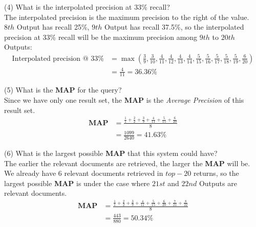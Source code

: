 \documentclass[12pt, letterpaper, twoside]{article}
\begin{document}
\begin{enumerate}
        (4) What is the interpolated precision at 33\% recall?\\
        The interpolated precision is the maximum precision to the right of the value.\\
        $8th$ Output has recall 25\%, $9th$ Output has recall 37.5\%, so the interpolated precision at 33\% recall will be the maximum precision among $9th$ to $20th$ Outputs:
        \begin{equation}
        \begin{split}
            \text{Interpolated precision @ 33\%} & = \max(\frac{3}{9},\frac{3}{10},\frac{4}{11},\frac{4}{12},\frac{4}{13},\frac{4}{14},\frac{5}{15},\frac{5}{16},\frac{5}{17},\frac{5}{18},\frac{5}{19},\frac{6}{20})\\
            & = \frac{4}{11} = 36.36\%
        \end{split}
        \end{equation}

        (5) What is the \textbf{MAP} for the query?\\
        Since we have only one result set, the \textbf{MAP} is the \textit{Average Precision} of this result set.\\
        \begin{equation}
        \begin{split}
            \textbf{MAP} & = \frac{\frac{1}{1} + \frac{2}{2} + \frac{3}{9} + \frac{4}{11} + \frac{5}{15} + \frac{6}{20}}{8}\\
            & = \frac{1099}{2640} = 41.63\%
        \end{split}
        \end{equation}

        (6) What is the largest possible \textbf{MAP} that this system could have?\\
        The earlier the relevant documents are retrieved, the larger the \textbf{MAP} will be.\\
        We already have 6 relevant documents retrieved in $top-20$ returns, so the largest possible \textbf{MAP} is under the case where $21st$ and $22nd$ Outputs are relevant documents.\\
        \begin{equation}
        \begin{split}
            \textbf{MAP} & = \frac{\frac{1}{1} + \frac{2}{2} + \frac{3}{9} + \frac{4}{11} + \frac{5}{15} + \frac{6}{20} + \frac{7}{21} + \frac{8}{22}}{8}\\
            & = \frac{443}{880} = 50.34\%
        \end{split}
        \end{equation}


\end{enumerate}
\end{document}
